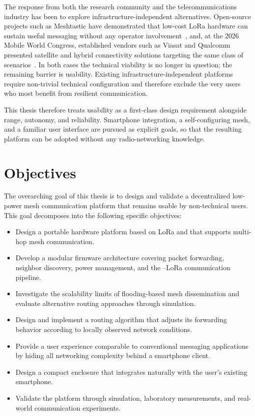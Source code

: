 \documentclass[english,bachelor]{tfgitic}[2026/01/22]
\begin{document}
The response from both the research community and the telecommunications industry has been to explore infrastructure-independent alternatives. Open-source projects such as Meshtastic have demonstrated that low-cost LoRa hardware can sustain useful messaging without any operator involvement~\cite{meshtastic}, and, at the 2026 Mobile World Congress, established vendors such as Viasat and Qualcomm presented satellite and hybrid connectivity solutions targeting the same class of scenarios~\cite{viasat_mwc_2026}. In both cases the technical viability is no longer in question; the remaining barrier is usability. Existing infrastructure-independent platforms require non-trivial technical configuration and therefore exclude the very users who most benefit from resilient communication.

This thesis therefore treats usability as a first-class design requirement alongside range, autonomy, and reliability. Smartphone integration, a self-configuring mesh, and a familiar user interface are pursued as explicit goals, so that the resulting platform can be adopted without any radio-networking knowledge.


\section{Objectives}
\label{sec:objectives}

The overarching goal of this thesis is to design and validate a decentralized low-power mesh communication platform that remains usable by non-technical users. This goal decomposes into the following specific objectives:

\begin{itemize}
\item Design a portable hardware platform based on LoRa and  that supports multi-hop mesh communication.

\item Develop a modular firmware architecture covering packet forwarding, neighbor discovery, power management, and the --LoRa communication pipeline.

\item Investigate the scalability limits of flooding-based mesh dissemination and evaluate alternative routing approaches through simulation.

\item Design and implement a routing algorithm that adjusts its forwarding behavior according to locally observed network conditions.

\item Provide a user experience comparable to conventional messaging applications by hiding all networking complexity behind a smartphone client.

\item Design a compact enclosure that integrates naturally with the user's existing smartphone.

\item Validate the platform through simulation, laboratory measurements, and real-world communication experiments.
\end{itemize}
\end{document}
